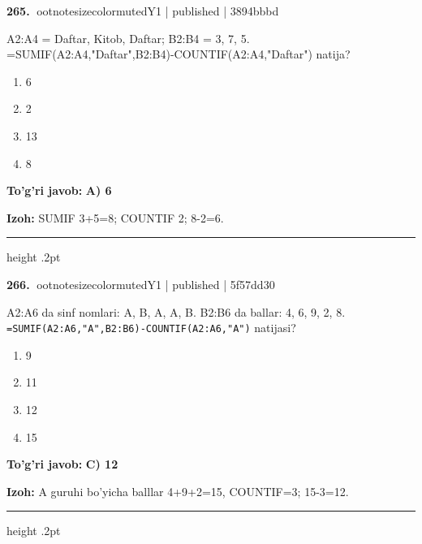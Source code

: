 \documentclass[10pt,a4paper]{article}
\begin{document}
\textbf{\color{ink}265.} {ootnotesizecolor{muted}Y1 | published | 3894bbbd}
\par
A2:A4 = Daftar, Kitob, Daftar; B2:B4 = 3, 7, 5. =SUMIF(A2:A4,"Daftar",B2:B4)-COUNTIF(A2:A4,"Daftar") natija?
\begin{enumerate}[label=\Alph*),leftmargin=9mm]
\item 6
\item 2
\item 13
\item 8
\end{enumerate}
\begin{tcolorbox}[enhanced,breakable,colback=teal!4,colframe=teal!55!black,boxrule=0.45pt,arc=1.2mm,left=2.8mm,right=2.8mm,top=2mm,bottom=2mm]
\textbf{\color{teal}To'g'ri javob:} \textbf{A) 6}
\par\smallskip
\textbf{Izoh:} SUMIF 3+5=8; COUNTIF 2; 8-2=6.
\end{tcolorbox}
\vspace{2mm}\hrule height .2pt\vspace{2mm}

\textbf{\color{ink}266.} {ootnotesizecolor{muted}Y1 | published | 5f57dd30}
\par
A2:A6 da sinf nomlari: A, B, A, A, B. B2:B6 da ballar: 4, 6, 9, 2, 8. \texttt{=SUMIF(A2:A6,"A",B2:B6)-COUNTIF(A2:A6,"A")} natijasi?
\begin{enumerate}[label=\Alph*),leftmargin=9mm]
\item 9
\item 11
\item 12
\item 15
\end{enumerate}
\begin{tcolorbox}[enhanced,breakable,colback=teal!4,colframe=teal!55!black,boxrule=0.45pt,arc=1.2mm,left=2.8mm,right=2.8mm,top=2mm,bottom=2mm]
\textbf{\color{teal}To'g'ri javob:} \textbf{C) 12}
\par\smallskip
\textbf{Izoh:} A guruhi bo'yicha balllar 4+9+2=15, COUNTIF=3; 15-3=12.
\end{tcolorbox}
\vspace{2mm}\hrule height .2pt\vspace{2mm}
\end{document}
